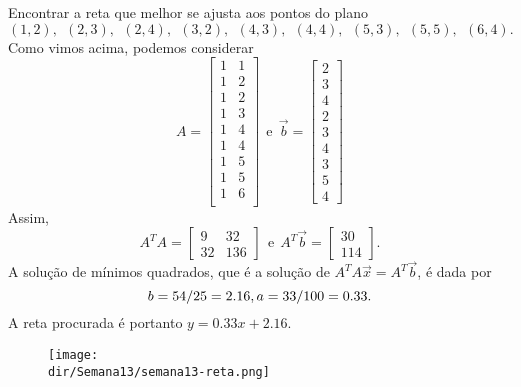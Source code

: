 \documentclass[../livro.tex]{subfiles}  %
\providecommand{\dir}{..}
\begin{document}
\begin{example}
  Encontrar a reta que melhor se ajusta aos pontos do plano
  \begin{equation}
  (1,2), \ \ (2,3), \ \ (2,4), \ \ (3,2), \ \ (4,3), \ \ (4,4), \ \ (5,3), \ \ (5,5), \ \ (6,4).
  \end{equation} Como vimos acima, podemos considerar
  \begin{equation}
  A =
  \begin{bmatrix}
    1 & 1 \\
    1 & 2 \\
    1 & 2 \\
    1 & 3 \\
    1 & 4 \\
    1 & 4 \\
    1 & 5 \\
    1 & 5 \\
    1 & 6 \\
  \end{bmatrix} \ \ \text{e} \ \
  \vec{b} =
  \begin{bmatrix}
    2\\3\\4\\2\\3\\4\\3\\5\\4
  \end{bmatrix}
  \end{equation} Assim,
  \begin{equation}
  A^T A =
  \begin{bmatrix}
    9  & 32  \\
    32  & 136
  \end{bmatrix}  \ \ \text{e} \ \
  A^T \vec{b} =
  \begin{bmatrix}
    30\\114
  \end{bmatrix}.
  \end{equation} A solução de mínimos quadrados, que é a solução de $A^T A \vec{x} = A^T\vec{b}$, é dada por
  \begin{equation}
  b = 54/25 = 2.16, \\ a = 33/100 = 0.33.
  \end{equation} A reta procurada é portanto $y = 0.33 x + 2.16$.
  \begin{figure}[h!]
    \begin{center}
      \texttt{[image: \\dir/Semana13/semana13-reta.png]}
    \end{center}
  \end{figure}
\end{example}
\end{document}
